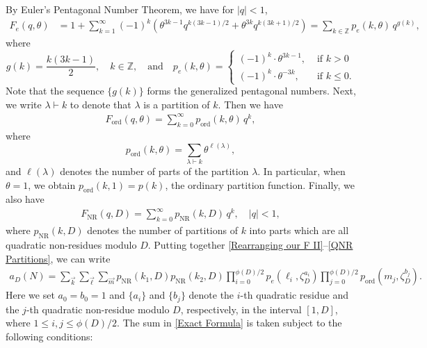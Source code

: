 \documentclass[11pt]{amsart}
\numberwithin{equation}{section}
\theoremstyle{remark}
\begin{document}
By Euler's Pentagonal Number Theorem, we have for $\lvert q\rvert <1$,
\begin{align}\label{Pentagonal Number Theorem}
F_e(q,\theta) &= 1+\sum_{k=1}^{\infty}(-1)^k\left(\theta^{3 k-1} q^{k(3 k-1) / 2}+\theta^{3 k} q^{k(3k+1) / 2}\right) =\sum_{k \in \mathbb{Z}} p_e(k,\theta) \, q^{g(k)},
\end{align}
where
\[
g(k) = \frac{k(3k-1)}{2}, \quad k \in \mathbb{Z}, \quad \textrm{and} \quad 
p_e(k,\theta) =\begin{cases}
  (-1)^k \cdot \theta^{3k-1},  & \textrm{if } k >0 \\
  (-1)^{k} \cdot \theta^{-3k} , \quad & \textrm{if } k \leq 0.
\end{cases}
\]
Note that the sequence $\{g(k) \}$ forms the generalized pentagonal numbers. Next, we write $\lambda \vdash k$ to denote that $\lambda$ is a partition of $k$. Then we have
\begin{align}\label{Ordinary Partition}
F_{\textrm{ord}}(q,\theta) = \sum_{k=0}^{\infty} p_{\textrm{ord}}(k,\theta) \, q^{k},
\end{align}
where 
\[
p_{\textrm{ord}}(k,\theta) = \sum_{\lambda \vdash k}  \theta^{\ell(\lambda)},
\]
and $\ell(\lambda)$ denotes the number of parts of the partition $\lambda$. In particular, when $\theta = 1$, we obtain $p_{\textrm{ord}}(k,1) =p(k)$, the ordinary partition function. Finally, we also have
\begin{align}\label{QNR Partitions}
F_{\textrm{NR}}(q,D) = \sum_{k=0}^{\infty}p_{\textrm{NR}} (k,D) \, q^k, \quad \lvert q \rvert < 1,
\end{align}
where $p_{\textrm{NR}}(k,D)$ denotes the number of partitions of $k$ into parts which are all quadratic non-residues modulo $D$. Putting together \eqref{Rearranging our F II}--\eqref{QNR Partitions}, we can write 
\begin{align}\label{Exact Formula}
    a_{D}(N) = \sum_{\vec{k}} \sum_{\vec{\ell}} \sum_{\vec{m}} p_{\textrm{NR}} (k_1,D)  p_{\textrm{NR}} (k_2,D) \prod_{i=0}^{\phi(D)/2} p_e(\ell_i, \zeta_{D}^{a_i}) \prod_{j=0}^{\phi(D)/2} p_{\textrm{ord}}(m_j, \zeta_{D}^{b_j}).
\end{align}
Here we set $a_0=b_0=1$ and \( \{a_i\} \) and \( \{b_j\} \) denote the \( i \)-th quadratic residue and the \( j \)-th quadratic non-residue modulo \( D \), respectively, in the interval \( [1, D] \), where $1 \leq i,j \leq \phi(D)/2$. The sum in \eqref{Exact Formula} is taken subject to the following conditions:
\end{document}

